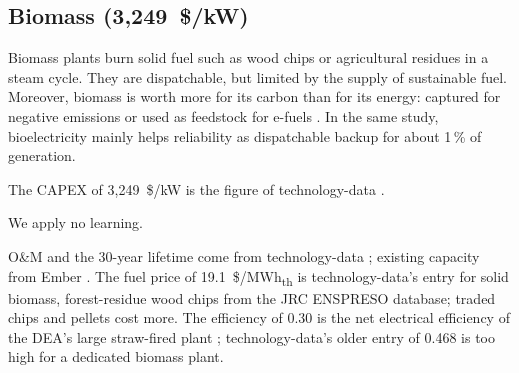 \subsection{Biomass (3,249~\$/kW)}\label{sec:biomass}
Biomass plants burn solid fuel such as wood chips or agricultural residues in a steam cycle.
They are dispatchable, but limited by the supply of sustainable fuel.
Moreover, biomass is worth more for its carbon than for its energy: captured for negative emissions or used as feedstock for e-fuels \citep{millinger2025}.
In the same study, bioelectricity mainly helps reliability as dispatchable backup for about 1\,\% of generation.

The CAPEX of 3,249~\$/kW is the figure of technology-data \citep{technologydata}.

We apply no learning.

O\&M and the 30-year lifetime come from technology-data \citep{technologydata}; existing capacity from Ember \citep{ember2025}.
The fuel price of 19.1~\$/MWh\textsubscript{th} is technology-data's entry for solid biomass, forest-residue wood chips from the JRC ENSPRESO database; traded chips and pellets cost more.
The efficiency of 0.30 is the net electrical efficiency of the DEA's large straw-fired plant \citep{dea}; technology-data's older entry of 0.468 is too high for a dedicated biomass plant.
